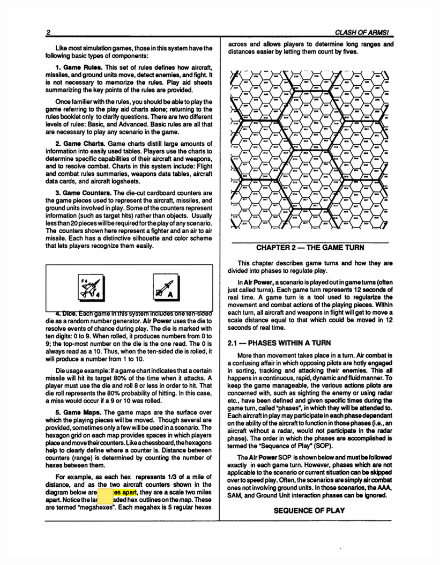 \begin{figure}[h!]
\centering
\includegraphics[width=\linewidth]{figures/figure-hexes.pdf}
\end{figure}